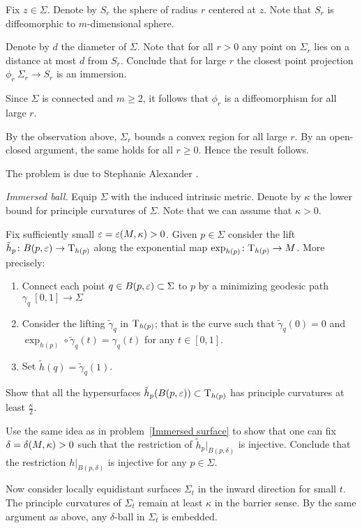 Fix $z\in \Sigma$.
Denote by $S_r$ the sphere of radius $r$ centered at $z$.
Note that $S_r$ is diffeomorphic to $m$-dimensional sphere.

Denote by $d$ the diameter of $\Sigma$.
Note that for all $r>0$
any point on $\Sigma_r$
lies on a distance at most $d$ from $S_r$.
Conclude that for large $r$ the closest point projection $\phi_r\:\Sigma_r\to S_r$ is an immersion.


Since $\Sigma$ is connected
and $m\ge 2$, it follows that $\phi_r$ is a diffeomorphism for all large $r$.

By the observation above, $\Sigma_r$ bounds a convex region for all large $r$.
By an open-closed argument, the same holds for all $r\ge 0$.
Hence the result follows.

The problem is due to Stephanie Alexander \cite[see][]{alexander}.



\textit{Immersed ball.}
Equip $\Sigma$ with the induced intrinsic metric.
Denote by $\kappa$ the lower bound for principle curvatures of $\Sigma$.
Note that we can assume that $\kappa>0$.

Fix sufficiently small $\varepsilon=\varepsilon(M,\kappa)>0$.
Given $p\in \Sigma$ consider the lift $\tilde h_p\colon B(p,\varepsilon)\to \mathrm{T}_{h(p)}$ along the exponential map $\exp_{h(p)}\colon\mathrm{T}_{h(p)}\to M$.
More precisely:
\begin{enumerate}
\item Connect each point $q\in B(p,\varepsilon)\subset \Sigma$ to $p$
by a minimizing geodesic  path $\gamma_q\:[0,1]\to \Sigma$
\item Consider the lifting $\tilde\gamma_q$ in $\mathrm{T}_{h(p)}$; 
that is the curve such that $\tilde\gamma_q(0)=0$ and $\exp_{h(p)}\circ\tilde\gamma_q(t)=\gamma_q(t)$ for any $t\in[0,1]$.
 \item Set $\tilde h(q)=\tilde\gamma_q(1)$.
\end{enumerate}

Show that all the hypersurfaces $\tilde h_p(B(p,\varepsilon))\subset \mathrm{T}_{h(p)}$ has principle curvatures at least $\tfrac\kappa2$.

Use the same idea as in problem~\ref{Immersed surface} to show that 
one can fix $\delta\z=\delta(M,\kappa)>0$ such that the restriction of $\tilde h_p|_{B(p,\delta)}$ is injective.
Conclude that the restriction $h|_{B(p,\delta)}$ is injective for any $p\in\Sigma$.

Now consider locally equidistant surfaces $\Sigma_t$ in the inward direction for small $t$. 
The principle curvatures of $\Sigma_t$ remain at least $\kappa$ in the barrier sense.
By the same argument as above, any $\delta$-ball in $\Sigma_t$
is embedded.

